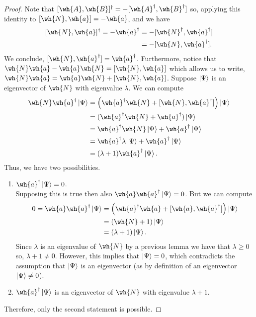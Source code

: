 \documentclass[12pt, a4paper]{article}
\begin{document}
\begin{proof}
    Note that \([\wh{A},\wh{B}]^{\dagger} = - [\wh{A}^{\dagger},\wh{B}^{\dagger}]\) so, applying this identity to \([\wh{N},\wh{a}]=-\wh{a}\), and we have
    \[\begin{aligned}
        [\wh{N},\wh{a}]^{\dagger} = -\wh{a}^{\dagger} &=  -[\wh{N}^{\dagger},\wh{a}^{\dagger}] \\
        &= -[\wh{N},\wh{a}^{\dagger}].
    \end{aligned}\]
    We conclude, \([\wh{N},\wh{a}^{\dagger}]=\wh{a}^{\dagger}\). Furthermore, notice that \(\wh{N}\wh{a}-\wh{a}\wh{N}=[\wh{N},\wh{a}]\) which  allows us to write, \(\wh{N}\wh{a}=\wh{a}\wh{N}+[\wh{N},\wh{a}]\).
    Suppose \(\ket{\Psi}\) is an eigenvector of \(\wh{N}\) with eigenvalue \(\lambda\). We can compute 
    \[\begin{aligned}
        \wh{N}\wh{a}^{\dagger} \ket{\Psi} &= \left( \wh{a}^{\dagger}\wh{N}+[\wh{N},\wh{a}^{\dagger}] \right) \ket{\Psi} \\
        &= (\wh{a}^{\dagger}\wh{N}+\wh{a}^{\dagger}) \ket{\Psi} \\
        &= \wh{a}^{\dagger}\wh{N} \ket{\Psi} +\wh{a}^{\dagger} \ket{\Psi} \\
        &= \wh{a}^{\dagger}\lambda \ket{\Psi} + \wh{a}^{\dagger}\ket{\Psi} \\
        &= (\lambda+1)\wh{a}^{\dagger}\ket{\Psi}.
    \end{aligned}\]
    Thus, we have two possibilities.
    \begin{enumerate}
        \item \(\wh{a}^{\dagger}\ket{\Psi}=0\). \\
        Supposing this is true then also \(\wh{a}\wh{a}^{\dagger}\ket{\Psi}=0\). But we can compute 
        \[\begin{aligned}
            0 = \wh{a}\wh{a}^{\dagger}\ket{\Psi} &= \left( \wh{a}^{\dagger}\wh{a}+[\wh{a},\wh{a}^{\dagger}]  \right) \ket{\Psi} \\
            &= (\wh{N}+1)\ket{\Psi} \\
            &=(\lambda+1) \ket{\Psi}.
        \end{aligned}\]
        Since \(\lambda\) is an eigenvalue of \(\wh{N}\) by a previous lemma we have that \(\lambda\geq 0\) so, \(\lambda +1 \neq 0\). However, this implies that \(\ket{\Psi} =0\), which contradicts the assumption that \(\ket{\Psi}\) is an eigenvector (as by definition of an eigenvector \(\ket{\Psi}\neq 0\)).
        \item \(\wh{a}^{\dagger}\ket{\Psi}\) is an eigenvector of \(\wh{N}\) with eigenvalue \(\lambda+1\).
    \end{enumerate}
    Therefore, only the second statement is possible.
\end{proof}
\end{document}
